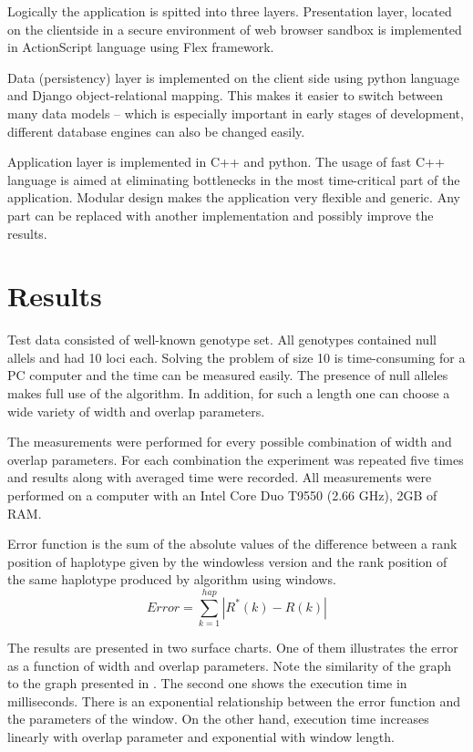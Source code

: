 \documentclass{llncs}
\begin{document}
Logically the application is spitted into three layers. 
Presentation layer, located on the clientside in a secure environment of web browser sandbox is implemented in ActionScript language using Flex framework. 


Data (persistency) layer is implemented on the client side using python language and Django object-relational mapping. 
This makes it easier to switch between many data models -- which is especially important in early stages of development, different database engines can also be changed easily.

Application layer is implemented in C++ and python. 
The usage of fast C++ language is aimed at eliminating bottlenecks in the most time-critical part of the application.
Modular design makes the application very flexible and generic. 
Any part can be replaced with another implementation and possibly improve the results. 


\section{Results}

Test data consisted of well-known genotype set. 
All genotypes contained null allels and had 10 loci each.
Solving the problem of size 10 is time-consuming for a PC computer and the time can be measured easily.
The presence of null alleles makes full use of the algorithm. 
In addition, for such a length one can choose a wide variety of width and overlap parameters.

The measurements were performed for every possible combination of width and overlap parameters.
For each combination the experiment was repeated five times and results along with averaged time were recorded.
All measurements were performed on a computer with an Intel Core Duo T9550 (2.66 GHz), 2GB of RAM.

Error function is the sum of the absolute values of the difference between a rank position of haplotype given by the windowless version and the rank position of the same haplotype produced by algorithm using windows.
$$ Error = \sum_{k=1}^{hap} |R^{*}(k) - R(k)|$$

The results are presented in two surface charts.
One of them illustrates the error as a function of width and overlap parameters.
Note the similarity of the graph to the graph presented in \cite{gusev}.
The second one shows the execution time in milliseconds.
There is an exponential relationship between the error function and the parameters of the window.
On the other hand, execution time increases linearly with overlap parameter and exponential with window length.
\end{document}
